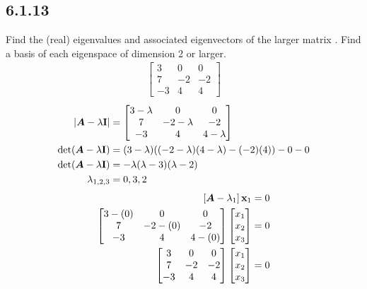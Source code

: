 \documentclass{article}
\begin{document}
\subsection{6.1.13}

Find the (real) eigenvalues and associated eigenvectors of the larger matrix . Find a basis of each eigenspace of dimension 2 or larger.
\begin{align*}
	\begin{bmatrix}
		3 & 0 & 0 \\
		7 & -2 & -2 \\
		-3 & 4 & 4
	\end{bmatrix}
\end{align*}
\begin{align*}
	\left| \matr{A} - \lambda \vect{I} \right| & =
		\begin{bmatrix}
			3 - \lambda & 0 & 0 \\
			7 & -2 - \lambda & -2 \\
			-3 & 4 & 4 - \lambda
		\end{bmatrix} \\
	\det( \matr{A} - \lambda \vect{I} ) & =
		(3 - \lambda)( (-2 - \lambda)(4 - \lambda) - (-2)(4) ) - 0 - 0 \\
	\det( \matr{A} - \lambda \vect{I} ) & = -\lambda(\lambda - 3)(\lambda - 2) \\
	\lambda_{1,2,3} & = 0, 3, 2
\end{align*}
\begin{align*}
	\left[ \matr{A} - \lambda_1 \right] \vect{x}_1 & = 0 \\
	\begin{bmatrix}
		3 - (0) & 0 & 0 \\
		7 & -2 - (0) & -2 \\
		-3 & 4 & 4 - (0)
	\end{bmatrix}
	\begin{bmatrix} x_1 \\ x_2 \\ x_3 \end{bmatrix} & = 0 \\
	\begin{bmatrix}
		3 & 0 & 0 \\
		7 & -2 & -2 \\
		-3 & 4 & 4
	\end{bmatrix}
	\begin{bmatrix} x_1 \\ x_2 \\ x_3 \end{bmatrix} & = 0
\end{align*}
\end{document}
